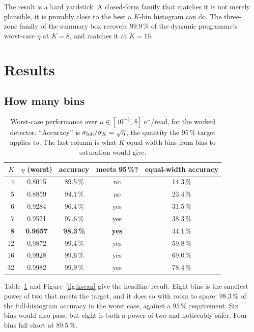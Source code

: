 \documentclass[11pt,a4paper]{article}
\newcommand{\eminus}{\ensuremath{\mathrm{e}^-}}
\begin{document}
The result is a hard yardstick. A closed-form family that matches it is not
merely plausible, it is provably close to the best a $K$-bin histogram can do.
The three-zone family of the summary box recovers $99.9\,\%$ of the dynamic
programme's worst-case $\eta$ at $K=8$, and matches it at $K=16$.

\section{Results}

\subsection{How many bins}

\begin{table}[h]
\centering
\small
\caption{Worst-case performance over $\mu \in [10^{-3},\,8]\ \eminus$/read, for
the worked detector. ``Accuracy'' is $\sigma_{\rm full}/\sigma_K = \sqrt{\eta}$,
the quantity the 95\,\% target applies to. The last column is what $K$
equal-width bins from bias to saturation would give.}
\label{tab:kscan}
\begin{tabular}{rccc c}
\toprule
$K$ & $\eta$ (worst) & accuracy & meets 95\,\%? & equal-width accuracy\\
\midrule
 4 & 0.8015 & 89.5\,\% & no  & 14.3\,\%\\
 5 & 0.8859 & 94.1\,\% & no  & 23.4\,\%\\
 6 & 0.9284 & 96.4\,\% & yes & 31.5\,\%\\
 7 & 0.9521 & 97.6\,\% & yes & 38.3\,\%\\
\textbf{8} & \textbf{0.9657} & \textbf{98.3\,\%} & \textbf{yes} & 44.1\,\%\\
12 & 0.9872 & 99.4\,\% & yes & 59.8\,\%\\
16 & 0.9928 & 99.6\,\% & yes & 69.0\,\%\\
32 & 0.9982 & 99.9\,\% & yes & 78.4\,\%\\
\bottomrule
\end{tabular}
\end{table}

Table~\ref{tab:kscan} and Figure~\ref{fig:kscan} give the headline result.
Eight bins is the smallest power of two that meets the target, and it does so
with room to spare: $98.3\,\%$ of the full-histogram accuracy in the worst case,
against a $95\,\%$ requirement. Six bins would also pass, but eight is both a
power of two and noticeably safer. Four bins fall short at $89.5\,\%$.
\end{document}
